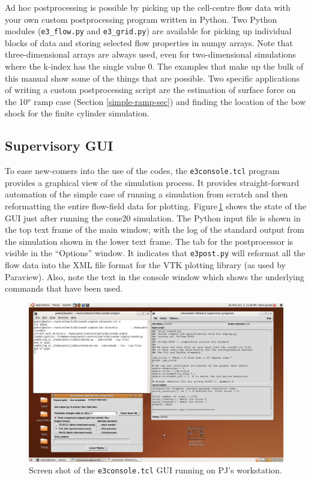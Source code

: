 \documentclass[12pt,a4paper,twoside]{article}
\begin{document}
\medskip 
Ad hoc postprocessing is possible by picking up the cell-centre flow
data with your own custom postprocessing program written in Python.
Two Python modules (\texttt{e3\_flow.py} and \texttt{e3\_grid.py}) 
are available for picking up individual blocks of data and storing
selected flow properties in numpy arrays.
Note that three-dimensional arrays are always used, even for two-dimensional simulations
where the k-index has the single value 0.
The examples that make up the bulk of this manual show some of the things that are possible.
Two specific applications of writing a custom postprocessing script are the estimation of 
surface force on the 10$^o$ ramp case (Section \ref{simple-ramp-sec}) and 
finding the location of the bow shock for the finite cylinder simulation.

\subsection{Supervisory GUI}
%
To ease new-comers into the use of the codes, the \texttt{e3console.tcl} program provides
a graphical view of the simulation process.
It provides straight-forward automation of the simple case of running a simulation
from scratch and then reformatting the entire flow-field data for plotting.
Figure\,\ref{e3console-screenshot-fig} shows the state of the GUI just after running the
cone20 simulation.
The Python input file is shown in the top text frame of the main window, 
with the log of the standard output from the simulation shown in the lower text frame.
The tab for the postprocessor is visible in the ``Options'' window.
It indicates that \texttt{e3post.py} will reformat all the flow data into the XML
file format for the VTK plotting library (as used by Paraview).
Also, note the text in the console window which shows the underlying commands that have been used. 

\begin{figure}
 \includegraphics[width=\textwidth]{figs/e3console-screenshot.png}
 \caption{Screen shot of the \texttt{e3console.tcl} GUI running on PJ's workstation.}
 \label{e3console-screenshot-fig}
\end{figure}
\end{document}

